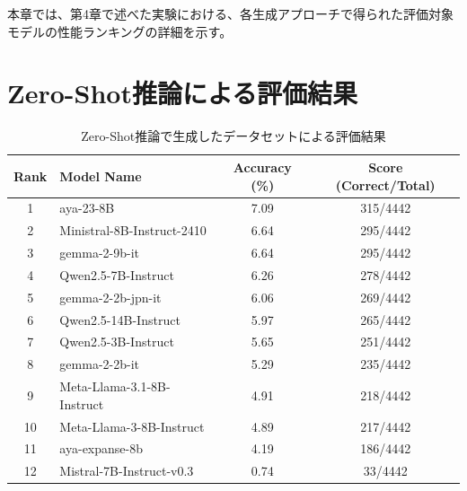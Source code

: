 \documentclass[a4paper,11pt]{jreport}
\begin{document}
本章では、第4章で述べた実験における、各生成アプローチで得られた評価対象モデルの性能ランキングの詳細を示す。

\section{Zero-Shot推論による評価結果}
\begin{table}[hbtp]
  \centering
  \caption{Zero-Shot推論で生成したデータセットによる評価結果}
  \label{tab:appendix_zero_shot}
  \begin{tabular}{clcc}
    \hline
    Rank & Model Name & Accuracy (\%) & Score (Correct/Total) \\
    \hline
    1 & aya-23-8B & 7.09 & 315/4442 \\
    2 & Ministral-8B-Instruct-2410 & 6.64 & 295/4442 \\
    3 & gemma-2-9b-it & 6.64 & 295/4442 \\
    4 & Qwen2.5-7B-Instruct & 6.26 & 278/4442 \\
    5 & gemma-2-2b-jpn-it & 6.06 & 269/4442 \\
    6 & Qwen2.5-14B-Instruct & 5.97 & 265/4442 \\
    7 & Qwen2.5-3B-Instruct & 5.65 & 251/4442 \\
    8 & gemma-2-2b-it & 5.29 & 235/4442 \\
    9 & Meta-Llama-3.1-8B-Instruct & 4.91 & 218/4442 \\
    10 & Meta-Llama-3-8B-Instruct & 4.89 & 217/4442 \\
    11 & aya-expanse-8b & 4.19 & 186/4442 \\
    12 & Mistral-7B-Instruct-v0.3 & 0.74 & 33/4442 \\
    \hline
  \end{tabular}
\end{table}
\end{document}
